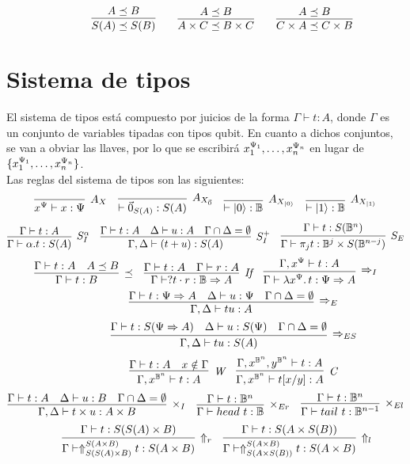 \[
	\quad\quad\quad
	\infer{S(A) \preceq S(B)}{A \preceq B}
	\quad\quad
	\infer{A \times C \preceq B \times C}{A \preceq B}
	\quad\quad
	\infer{C \times A \preceq C \times B}{A \preceq B}
\]

\section{Sistema de tipos}
El sistema de tipos está compuesto por juicios de la forma \( \Gamma \vdash t:A \), donde \( \Gamma \) es un conjunto de variables tipadas con tipos qubit. En cuanto a dichos conjuntos, se van a obviar las llaves, por lo que se escribirá \( x_1^{\Psi_1},\ldots,x_n^{\Psi_n} \) en lugar de \( \{x_1^{\Psi_1},\ldots,x_n^{\Psi_n}\} \).
\\Las reglas del sistema de tipos son las siguientes:
\[
	\infer[A_X]{\vrbl{x}{\Psi} \vdash x : \Psi}{}
	\quad
	\infer[A_{X_{\vec{0}}}]{\vdash \nullvec{A}: S(A)}{}
	\quad
	\infer[A_{X_{\ket{0}}}]{\vdash \ket{0}: \qubittype}{}
	\quad
	\infer[A_{X_{\ket{1}}}]{\vdash \ket{1}: \qubittype}{}
\]
\[
	\infer[S^{\alpha}_{I}]{\Gamma \vdash \alpha . t : S(A)}{\Gamma \vdash t: A}
	\quad
	\infer[S^{+}_{I}]{\Gamma, \Delta \vdash (t + u): S(A)}{\Gamma \vdash t : A & \Delta \vdash u : A & \Gamma \cap \Delta = \emptyset}
	\quad
	\infer[S_E]{\Gamma \vdash \proj{j}{t} : \qubittype^j \times S(\qubittype^{n - j})}{\Gamma \vdash t : S(\qubittype^n)}
\]
\[
	\infer[\preceq]{\Gamma \vdash t : B}{\Gamma \vdash t: A & A \preceq B}
	\quad
	\infer[\textit{If}]{\Gamma \vdash \ifte{}{t}{r}: \qubittype \Rightarrow A}{\Gamma \vdash t : A & \Gamma \vdash r : A}
	\quad
	\infer[\Rightarrow_I]{\Gamma \vdash \abstr{\vrbl{x}{\Psi}}{t} : \Psi \Rightarrow A}{\Gamma, \vrbl{x}{\Psi} \vdash t : A}
\]
\[
	\quad\quad\quad\quad\quad
	\infer[\Rightarrow_E]{\Gamma, \Delta \vdash \app{t}{u} : A}{\Gamma \vdash t : \Psi \Rightarrow A & \Delta \vdash u : \Psi & \Gamma \cap \Delta = \emptyset}
\]
\[
	\quad\quad\quad\quad\quad
	\infer[\Rightarrow_{ES}]{\Gamma, \Delta \vdash t u : S(A)}{\Gamma \vdash t : S(\Psi \Rightarrow A) & \Delta \vdash u : S(\Psi) & \Gamma \cap \Delta = \emptyset}
\]
\[
	\quad\quad\quad\quad\quad
	\infer[\textit{W}]{\Gamma, \vrbl{x}{\qubittype^n} \vdash t : A}{\Gamma \vdash t: A & x \notin \Gamma}
	\quad
	\infer[\textit{C}]{\Gamma, \vrbl{x}{\qubittype^n} \vdash t[x/y] : A}{\Gamma, \vrbl{x}{\qubittype^n}, \vrbl{y}{\qubittype^n} \vdash t : A}
\]
\[
	\infer[\times_I]{\Gamma, \Delta \vdash t \times u : A \times B}{\Gamma \vdash t : A & \Delta \vdash u : B & \Gamma \cap \Delta = \emptyset}
	\quad
	\infer[\times_{Er}]{\Gamma \vdash head\ t : \qubittype}{\Gamma \vdash t : \qubittype^n}
	\quad
	\infer[\times_{El}]{\Gamma \vdash tail\ t : \qubittype^{n - 1}}{\Gamma \vdash t : \qubittype^n}
\]
\[
	\quad\quad
	\infer[\Uparrow_r]{\Gamma \vdash \cast{S(S(A) \times B)}{S(A \times B)} t : S(A \times B)}{\Gamma \vdash t : S(S(A) \times B)}
	\quad
	\infer[\Uparrow_l]{\Gamma \vdash \cast{S(A \times S(B))}{S(A \times B)} t : S(A \times B)}{\Gamma \vdash t : S(A \times S(B))}
\]

